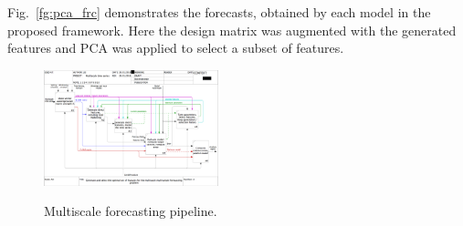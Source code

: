 \documentclass[conference]{IEEEtran}
\begin{document}
Fig.~\ref{fg:pca_frc} demonstrates the forecasts, obtained by each model in the proposed framework. Here the design matrix was augmented with the generated features and PCA was applied to select a subset of features.



\begin{figure}[!t]
\centering\includegraphics[width=0.45\textwidth]{02_A0.png}
\label{fg:IDEF}
\caption{Multiscale forecasting pipeline.}
\end{figure}
\end{document}
